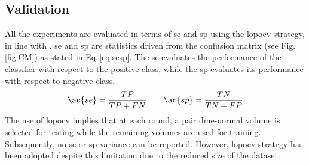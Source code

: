 \subsection{Validation}\label{sec:exp:validation}
All the experiments are evaluated in terms of \acf{se} and \acf{sp} using the \ac{lopocv} strategy, in line with \cite{Lemaintre2015miccaiOCT}.
\ac{se} and \ac{sp} are statistics driven from the confusion matrix (see Fig.\,\ref{fig:CM}) as stated in Eq.\,\eqref{eq:sesp}.
The \ac{se} evaluates the performance of the classifier with respect to the positive class, while the \ac{sp} evaluates its performance with respect to negative class.
\begin{align}
 \ac{se}  = \frac{TP}{TP+FN} \qquad \ac{sp} = \frac{TN}{TN+FP}
 \label{eq:sesp}
\end{align}
The use of \ac{lopocv} implies that at each round, a pair \ac{dme}-normal volume is selected for testing while the remaining volumes are used for training.
Subsequently, no \ac{se} or \ac{sp} variance can be reported.
However, \ac{lopocv} strategy has been adopted despite this limitation due to the reduced size of the dataset.







